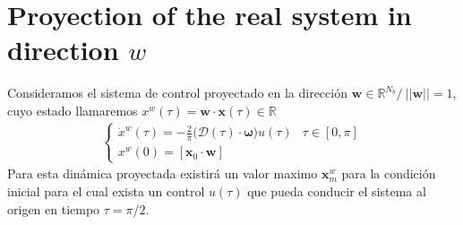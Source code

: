 \section{Proyection of the real system in direction $w$}
Consideramos el sistema de control proyectado en la dirección $\bm{w} \in \mathbb{R}^{N_b}  / \  ||\bm{w}|| = 1$, cuyo estado llamaremos $x^w(\tau) = \bm{w} \cdot\bm{x}(\tau) \in \mathbb{R}$
\begin{gather}
    \begin{cases}
        \displaystyle\dot{x}^w(\tau) = 
        -\frac{2}{\pi} 
        \big( \bm{\mathcal{D}}(\tau) \cdot \bm{\omega} \big)  
        u(\tau) 
        & \tau \in [0,\pi]\\[6pt]
        \displaystyle x^w(0) =  [\bm{x}_0 \cdot \bm{w}]
    \end{cases}
\end{gather}
Para esta dinámica proyectada existirá un valor maximo  $\bm{x}_{m}^w$ para la condición inicial para el cual exista un control $u(\tau)$ que pueda conducir el sistema al origen en tiempo $\tau = \pi/2$.  

